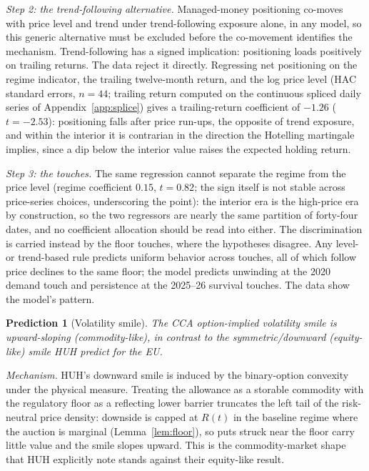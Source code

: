 \documentclass[11pt,letterpaper]{article}
\theoremstyle{plain}
\newtheorem{prediction}{Prediction}[section]
\theoremstyle{definition}
\numberwithin{equation}{section}
\begin{document}
\emph{Step 2: the trend-following alternative.} Managed-money positioning co-moves with price level and trend under trend-following exposure alone, in any model, so this generic alternative must be excluded before the co-movement identifies the mechanism. Trend-following has a signed implication: positioning loads positively on trailing returns. The data reject it directly. Regressing net positioning on the regime indicator, the trailing twelve-month return, and the log price level (HAC standard errors, $n=44$; trailing return computed on the continuous spliced daily series of Appendix~\ref{app:splice}) gives a trailing-return coefficient of $-1.26$ ($t=-2.53$): positioning falls after price run-ups, the opposite of trend exposure, and within the interior it is contrarian in the direction the Hotelling martingale implies, since a dip below the interior value raises the expected holding return.

\emph{Step 3: the touches.} The same regression cannot separate the regime from the price level (regime coefficient $0.15$, $t=0.82$; the sign itself is not stable across price-series choices, underscoring the point): the interior era is the high-price era by construction, so the two regressors are nearly the same partition of forty-four dates, and no coefficient allocation should be read into either. The discrimination is carried instead by the floor touches, where the hypotheses disagree. Any level- or trend-based rule predicts uniform behavior across touches, all of which follow price declines to the same floor; the model predicts unwinding at the 2020 demand touch and persistence at the 2025--26 survival touches. The data show the model's pattern.

\begin{prediction}[Volatility smile]\label{pred:smile}
The CCA option-implied volatility smile is upward-sloping (commodity-like), in contrast to the symmetric/downward (equity-like) smile HUH predict for the EU.
\end{prediction}
 
\noindent\emph{Mechanism.} HUH's downward smile is induced by the binary-option convexity under the physical measure. Treating the allowance as a storable commodity with the regulatory floor as a reflecting lower barrier truncates the left tail of the risk-neutral price density: downside is capped at $R(t)$ in the baseline regime where the auction is marginal (Lemma~\ref{lem:floor}), so puts struck near the floor carry little value and the smile slopes upward. This is the commodity-market shape that HUH explicitly note stands against their equity-like result.
\end{document}
